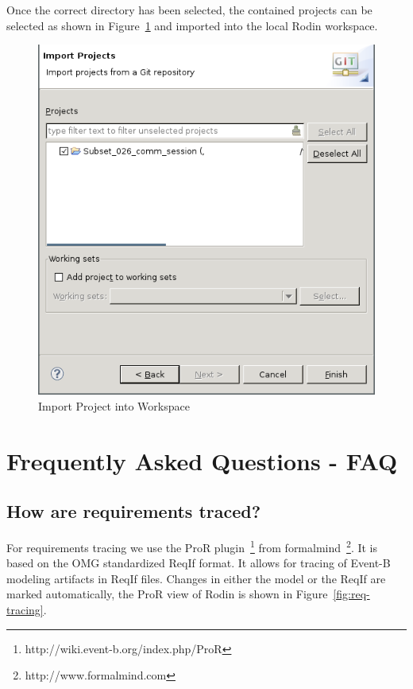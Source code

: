 \documentclass[10pt,a4paper]{article}
\newcommand{\skalierung}{.6}
\begin{document}
Once the correct directory has been selected, the contained projects can be
selected as shown in Figure~\ref{fig:import-project-workspace} and imported into
the local Rodin workspace.

\begin{figure}[H]
  \centering
  \includegraphics[width=\skalierung\textwidth]{project_import_step8}
  \caption{Import Project into Workspace}
  \label{fig:import-project-workspace}
\end{figure}

\section{Frequently Asked Questions - FAQ}
\label{sec:faq}

\subsection{How are requirements traced?}
\label{sec:how-are-requirements}

For requirements tracing we use the ProR
plugin~\footnote{http://wiki.event-b.org/index.php/ProR} from
formalmind~\footnote{http://www.formalmind.com}. It is based on the OMG
standardized ReqIf format. It allows for tracing of Event-B modeling artifacts
in ReqIf files. Changes in either the model or the ReqIf are marked
automatically, the ProR view of Rodin is shown in Figure~\ref{fig:req-tracing}.
\end{document}
